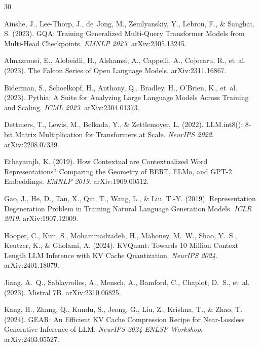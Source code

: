\documentclass[11pt]{article}
\begin{document}
\begin{thebibliography}{30}

Ainslie, J., Lee-Thorp, J., de~Jong, M., Zemlyanskiy, Y., Lebron, F., \& Sanghai, S. (2023).
\newblock GQA: Training Generalized Multi-Query Transformer Models from Multi-Head Checkpoints.
\newblock \emph{EMNLP 2023}. arXiv:2305.13245.

Almazrouei, E., Alobeidli, H., Alshamsi, A., Cappelli, A., Cojocaru, R., et~al. (2023).
\newblock The Falcon Series of Open Language Models.
\newblock arXiv:2311.16867.

Biderman, S., Schoelkopf, H., Anthony, Q., Bradley, H., O'Brien, K., et~al. (2023).
\newblock Pythia: A Suite for Analyzing Large Language Models Across Training and Scaling.
\newblock \emph{ICML 2023}. arXiv:2304.01373.

Dettmers, T., Lewis, M., Belkada, Y., \& Zettlemoyer, L. (2022).
\newblock LLM.int8(): 8-bit Matrix Multiplication for Transformers at Scale.
\newblock \emph{NeurIPS 2022}. arXiv:2208.07339.

Ethayarajh, K. (2019).
\newblock How Contextual are Contextualized Word Representations? Comparing the Geometry of BERT, ELMo, and GPT-2 Embeddings.
\newblock \emph{EMNLP 2019}. arXiv:1909.00512.

Gao, J., He, D., Tan, X., Qin, T., Wang, L., \& Liu, T.-Y. (2019).
\newblock Representation Degeneration Problem in Training Natural Language Generation Models.
\newblock \emph{ICLR 2019}. arXiv:1907.12009.

Hooper, C., Kim, S., Mohammadzadeh, H., Mahoney, M.~W., Shao, Y.~S., Keutzer, K., \& Gholami, A. (2024).
\newblock KVQuant: Towards 10 Million Context Length LLM Inference with KV Cache Quantization.
\newblock \emph{NeurIPS 2024}. arXiv:2401.18079.

Jiang, A.~Q., Sablayrolles, A., Mensch, A., Bamford, C., Chaplot, D.~S., et~al. (2023).
\newblock Mistral 7B.
\newblock arXiv:2310.06825.

Kang, H., Zhang, Q., Kundu, S., Jeong, G., Liu, Z., Krishna, T., \& Zhao, T. (2024).
\newblock GEAR: An Efficient KV Cache Compression Recipe for Near-Lossless Generative Inference of LLM.
\newblock \emph{NeurIPS 2024 ENLSP Workshop}. arXiv:2403.05527.


\end{thebibliography}
\end{document}
